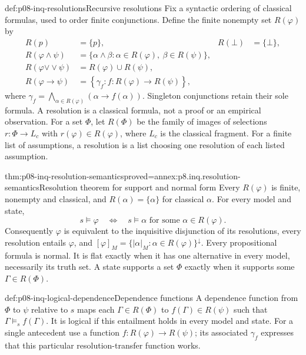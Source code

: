 \begin{hbdefinition}{def:p08-inq-resolutions}{Recursive resolutions}
Fix a syntactic ordering of classical formulas, used to order finite
conjunctions. Define the finite nonempty set \(R(\varphi)\) by
\[
\begin{aligned}
 R(p)&=\{p\},&R(\bot)&=\{\bot\},\\
 R(\varphi\land\psi)&=\{\alpha\land\beta:
              \alpha\in R(\varphi),\ \beta\in R(\psi)\},\\
 R(\varphi\mathbin{\vee\!\vee}\psi)&=R(\varphi)\cup R(\psi),\\
 R(\varphi\to\psi)&=
 \left\{\gamma_f:f:R(\varphi)\to R(\psi)\right\},
\end{aligned}
\]
where \(\gamma_f=\bigwedge_{\alpha\in R(\varphi)}(\alpha\to f(\alpha))\).
Singleton conjunctions retain their sole formula. A resolution is a
classical formula, not a proof or an empirical observation. For a set
\(\Phi\), let \(R(\Phi)\) be the family of images of selections
\(r:\Phi\to L_c\) with \(r(\varphi)\in R(\varphi)\), where \(L_c\)
is the classical fragment. For a finite list of assumptions, a resolution
is a list choosing one resolution of each listed assumption.
\end{hbdefinition}

\begin{hbtheorem}{thm:p08-inq-resolution-semantics}{proved=annex:p8.inq.resolution-semantics}{Resolution theorem for support and normal form}
Every \(R(\varphi)\) is finite, nonempty and classical, and
\(R(\alpha)=\{\alpha\}\) for classical \(\alpha\). For every model and state,
\[
 s\models\varphi
 \quad\Longleftrightarrow\quad
 s\models\alpha\text{ for some }\alpha\in R(\varphi).
\]
Consequently \(\varphi\) is equivalent to the inquisitive disjunction of
its resolutions, every resolution entails \(\varphi\), and
\([\varphi]_M=\{|\alpha|_M:\alpha\in R(\varphi)\}^\downarrow\).
Every propositional formula is normal. It is flat exactly when it has one
alternative in every model, necessarily its truth set. A state supports a
set \(\Phi\) exactly when it supports some \(\Gamma\in R(\Phi)\).
\end{hbtheorem}

\begin{hbdefinition}{def:p08-inq-logical-dependence}{Dependence functions}
A dependence function from \(\Phi\) to \(\psi\) relative to \(s\) maps
each \(\Gamma\in R(\Phi)\) to \(f(\Gamma)\in R(\psi)\) such that
\(\Gamma\models_s f(\Gamma)\). It is logical if this entailment holds
in every model and state. For a single antecedent use a function
\(f:R(\varphi)\to R(\psi)\); its associated \(\gamma_f\) expresses
that this particular resolution-transfer function works.
\end{hbdefinition}

